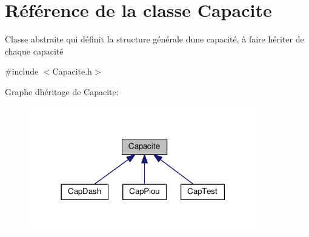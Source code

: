 \hypertarget{class_capacite}{}\section{Référence de la classe Capacite}
\label{class_capacite}


Classe abstraite qui définit la structure générale d\textquotesingle{}une capacité, à faire hériter de chaque capacité  




{\ttfamily \#include $<$Capacite.\+h$>$}



Graphe d\textquotesingle{}héritage de Capacite\+:\nopagebreak
\begin{figure}[H]
\begin{center}
\leavevmode
\includegraphics[width=282pt]{class_capacite__inherit__graph}
\end{center}
\end{figure}

